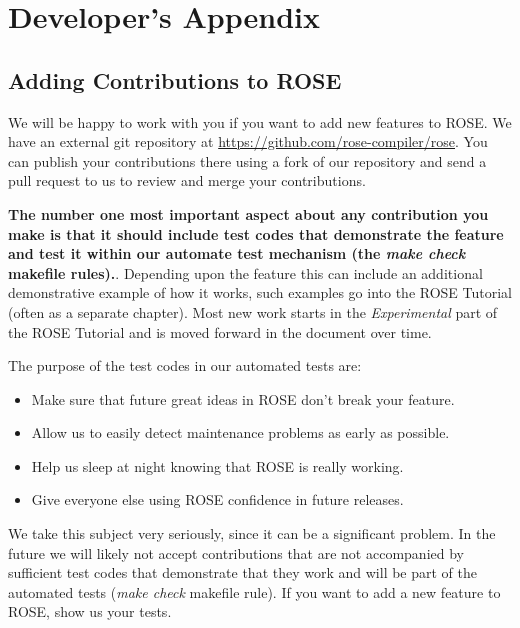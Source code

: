 
\chapter{ Developer's Appendix }
\label{developersAppendix:developersAppendix}

\section{Adding Contributions to ROSE}%

   We will be happy to work with you if you want to add new features to ROSE.
We have an external git repository at \url{https://github.com/rose-compiler/rose}. 
You can publish your contributions there using a fork of our repository and send a pull request to us to review and merge your contributions.

{\bf The number one most important aspect about any contribution you make is that it
should include test codes that demonstrate the feature and test it within our 
automate test mechanism (the {\em make check} makefile rules).}. Depending upon the 
feature this can include an additional demonstrative example of how it works, such
examples go into the ROSE Tutorial (often as a separate chapter).  Most new work
starts in the {\em Experimental} part of the ROSE Tutorial and is moved forward
in the document over time.

The purpose of the test codes in our automated tests are:
\begin{itemize}
   \item Make sure that future great ideas in ROSE don't break your feature.
   \item Allow us to easily detect maintenance problems as early as possible.
   \item Help us sleep at night knowing that ROSE is really working.
   \item Give everyone else using ROSE confidence in future releases.
\end{itemize}

We take this subject very seriously, since it can be a significant problem.
In the future we will likely not accept contributions that are not accompanied 
by sufficient test codes that demonstrate that they work and will be part of the
automated tests ({\em make check} makefile rule).  If you want to add a new 
feature to ROSE, show us your tests.


